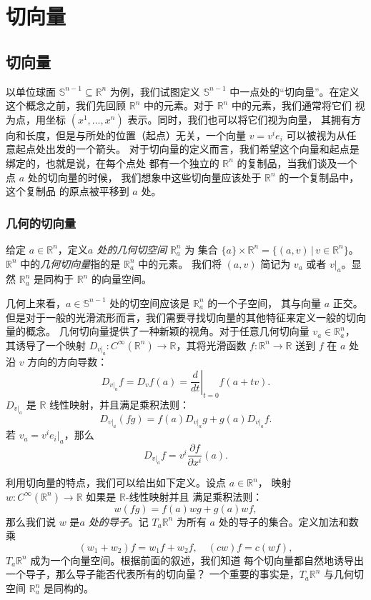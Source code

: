 \documentclass[fontset=none]{Notes}
\begin{document}
\chapter{切向量}

\section{切向量}

以单位球面 $\mathbb{S}^{n-1}\subseteq\mathbb{R}^n$ 为例，我们试图定义
$\mathbb{S}^{n-1}$ 中一点处的“切向量”。在定义这个概念之前，我们先回顾
$\mathbb{R}^n$ 中的元素。对于 $\mathbb{R}^n$ 中的元素，我们通常将它们
视为点，用坐标 $(x^1,\dots,x^n)$ 表示。同时，我们也可以将它们视为向量，
其拥有方向和长度，但是与所处的位置（起点）无关，一个向量 $v=v^ie_i$
可以被视为从任意起点处出发的一个箭头。
对于切向量的定义而言，我们希望这个向量和起点是绑定的，也就是说，在每个点处
都有一个独立的 $\mathbb{R}^n$ 的复制品，当我们谈及一个点 $a$ 处的切向量的时候，
我们想象中这些切向量应该处于 $\mathbb{R}^n$ 的一个复制品中，这个复制品
的原点被平移到 $a$ 处。


\subsection{几何的切向量}

给定 $a\in\mathbb{R}^n$，定义\emph{$a$ 处的几何切空间} $\mathbb{R}_a^n$ 为
集合 $\{a\}\times\mathbb{R}^n=\{(a,v)\,|\, v\in\mathbb{R}^n\}$。
$\mathbb{R}^n$ 中的\emph{几何切向量}指的是 $\mathbb{R}_a^n$ 中的元素。
我们将 $(a,v)$ 简记为 $v_a$ 或者 $v|_a$。显然 $\mathbb{R}_a^n$
是同构于 $\mathbb{R}^n$ 的向量空间。

几何上来看，$a\in\mathbb{S}^{n-1}$ 处的切空间应该是 $\mathbb{R}_a^n$ 的一个子空间，
其与向量 $a$ 正交。但是对于一般的光滑流形而言，我们需要寻找切向量的其他特征来定义一般的切向量的概念。
几何切向量提供了一种新颖的视角。对于任意几何切向量 $v_a\in\mathbb{R}_a^n$，
其诱导了一个映射 $D_{v|_a}:C^\infty(\mathbb{R}^n)\to\mathbb{R}$，其将光滑函数
$f:\mathbb{R}^n\to\mathbb{R}$ 送到 $f$ 在 $a$ 处沿 $v$ 方向的方向导数：
\[
  D_{v|_a}f=D_vf(a)=\left.\frac{d}{dt}\right|_{t=0}f(a+tv).  
\]
$D_{v|_a}$ 是 $\mathbb{R}$ 线性映射，并且满足乘积法则：
\[
  D_{v|_a}(fg)=f(a)D_{v|_a}g+g(a)D_{v|_a}f.
\]
若 $v_a=v^ie_{i}|_a$，那么
\[
  D_{v|_a}f=v^i\frac{\partial f}{\partial x^i}(a)  .
\]

利用切向量的特点，我们可以给出如下定义。设点 $a\in\mathbb{R}^n$，
映射 $w:C^\infty(\mathbb{R}^n)\to\mathbb{R}$ 如果是 $\mathbb{R}$-线性映射并且
满足乘积法则：
\[
  w(fg)=f(a)wg+g(a)wf, 
\]
那么我们说 $w$ 是\emph{$a$ 处的导子}。记 $T_a\mathbb{R}^n$ 为所有
$a$ 处的导子的集合。定义加法和数乘
\[
  (w_1+w_2)f=w_1f+w_2f,\quad (cw)f=c(wf),
\]
$T_a\mathbb{R}^n$ 成为一个向量空间。根据前面的叙述，我们知道
每个切向量都自然地诱导出一个导子，那么导子能否代表所有的切向量？
一个重要的事实是，$T_a\mathbb{R}^n$ 与几何切空间 $\mathbb{R}_a^n$
是同构的。
\end{document}
